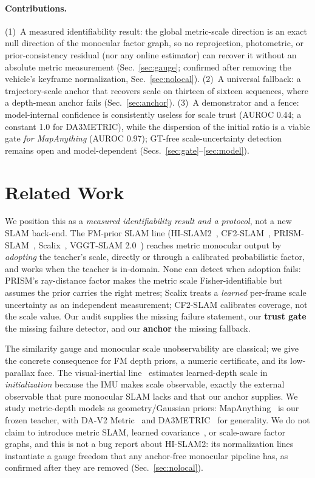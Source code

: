\paragraph{Contributions.} (1)~A measured identifiability result: the global
metric-scale direction is an exact null direction of the monocular factor graph,
so no reprojection, photometric, or prior-consistency residual (nor any online
estimator) can recover it without an absolute metric measurement
(Sec.~\ref{sec:gauge}; confirmed after removing the vehicle's keyframe normalization, Sec.~\ref{sec:nolocal}).
(2)~A universal fallback: a trajectory-scale anchor that recovers scale on
thirteen of sixteen sequences, where a depth-mean anchor fails (Sec.~\ref{sec:anchor}).
(3)~A demonstrator and a fence: model-internal confidence is consistently useless
for scale trust (AUROC 0.44; a constant 1.0 for DA3METRIC), while the dispersion
of the initial ratio is a viable gate \emph{for MapAnything} (AUROC 0.97);
GT-free scale-uncertainty detection remains open and model-dependent
(Secs.~\ref{sec:gate}--\ref{sec:model}).

\section{Related Work}

We position this as a \emph{measured identifiability result and a protocol}, not
a new SLAM back-end. The FM-prior SLAM line (HI-SLAM2~\cite{hislam2},
CF2-SLAM~\cite{cf2slam}, PRISM-SLAM~\cite{prismslam}, Scalix~\cite{scalix},
VGGT-SLAM 2.0~\cite{vggtslam2}) reaches metric monocular output by
\emph{adopting} the teacher's scale, directly or through a calibrated
probabilistic factor, and works when the teacher is in-domain. None can detect
when adoption fails: PRISM's ray-distance factor makes the metric scale
Fisher-identifiable but assumes the prior carries the right metres; Scalix treats
a \emph{learned} per-frame scale uncertainty as an independent measurement;
CF2-SLAM calibrates coverage, not the scale value. Our audit supplies the missing
failure statement, our \textbf{trust gate} the missing failure detector, and our
\textbf{anchor} the missing fallback.

The similarity gauge and monocular scale unobservability are classical; we give
the concrete consequence for FM depth priors, a numeric certificate, and its
low-parallax face. The visual-inertial line~\cite{merrill,hailu} estimates
learned-depth scale in \emph{initialization} because the IMU makes scale
observable, exactly the external observable that pure monocular SLAM lacks and
that our anchor supplies. We study metric-depth models as geometry/Gaussian
priors: MapAnything~\cite{mapanything} is our frozen teacher, with DA-V2
Metric~\cite{depthanythingv2} and DA3METRIC~\cite{da3} for generality. We do not
claim to introduce metric SLAM, learned covariance~\cite{macvo}, or scale-aware
factor graphs, and this is not a bug report about HI-SLAM2: its normalization
lines instantiate a gauge freedom that any anchor-free monocular pipeline has, as
confirmed after they are removed (Sec.~\ref{sec:nolocal}).


